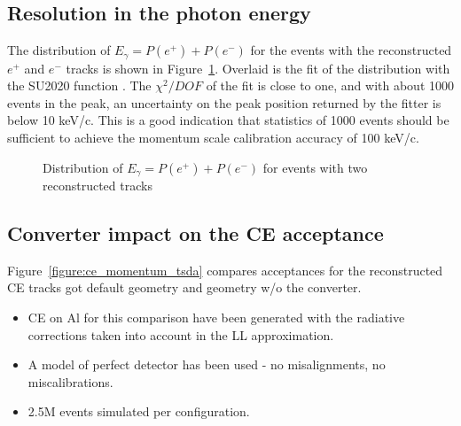 \subsection{Resolution in the photon energy}

The distribution of $E_\gamma = P(e^+) + P(e^-)$ for the events with the reconstructed
$e^+$ and $e^-$ tracks is shown in Figure~\ref{figure:t2_0_smom_1}.
Overlaid is the fit of the distribution with the SU2020 function \cite{MU2E_SU2020_PAPER}.
The $\chi^2/DOF$ of the fit is close to one, and with about 1000 events in the peak,
an uncertainty on the peak position returned by the fitter is below 10 keV/c.
This is a good indication that statistics of 1000 events should be sufficient
to achieve the momentum scale calibration accuracy of 100 keV/c.

\begin{figure}[H]
  \caption{
    \label{figure:t2_0_smom_1}
    Distribution of $E_\gamma = P(e^+) + P(e^-)$ for events with two reconstructed tracks
  }
\end{figure}

\newpage
\subsection{Converter impact on the CE acceptance}

Figure~\ref{figure:ce_momentum_tsda} compares acceptances for the reconstructed CE tracks
got default geometry and geometry w/o the converter.
\begin{itemize}
\item 
  CE on Al for this comparison have been generated with the radiative corrections
  taken into account in the LL approximation.
\item 
  A model of perfect detector has been used - no misalignments, no miscalibrations.
\item
  2.5M events simulated per configuration.
\end{itemize}

